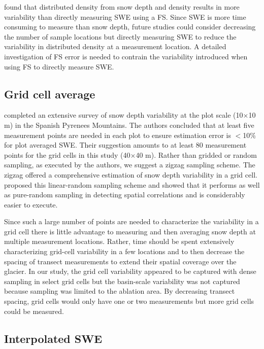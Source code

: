 \documentclass[review,oneside, letterpaper]{igs}
\begin{document}
\cite{Wetlaufer2016} found that distributed density from snow depth and density results in more variability than directly measuring SWE using a FS. Since SWE is more time consuming to measure than snow depth, future studies could consider decreasing the number of sample locations but directly measuring SWE to reduce the variability in distributed density at a measurement location. A detailed investigation of FS error is needed to contrain the variability introduced when using FS to directly measure SWE.

\subsection{Grid cell average}

\cite{Lopez2011} completed an extensive survey of snow depth variability at the plot scale (10$\times$10 m) in the Spanish Pyrenees Mountains. The authors concluded that at least five measurement points are needed in each plot to ensure estimation error is $<$10\% for plot averaged SWE. Their suggestion amounts to at least 80 measurement points for the grid cells in this study (40$\times$40 m). Rather than gridded or random sampling, as executed by the authors, we suggest a zigzag sampling scheme. The zigzag offered a comprehensive estimation of snow depth variability in a grid cell. \cite{Shea2010} proposed this linear-random sampling scheme and showed that it performs as well as pure-random sampling in detecting spatial correlations and is considerably easier to execute. 

Since such a large number of points are needed to characterize the variability in a grid cell there is little advantage to measuring and then averaging snow depth at multiple measurement locations. Rather, time should be spent extensively characterizing grid-cell variability in a few locations and to then decrease the spacing of transect measurements to extend their spatial coverage over the glacier. In our study, the grid cell variability appeared to be captured with dense sampling in select grid cells but the basin-scale variability was not captured because sampling was limited to the ablation area. By decreasing transect spacing, grid cells would only have one or two measurements but more grid cells could be measured. 

\subsection{Interpolated SWE}
\end{document}

